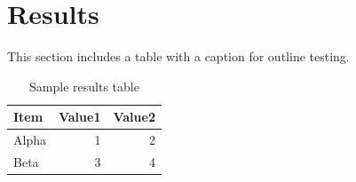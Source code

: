 \section{Results}\label{sec:results}
This section includes a table with a caption for outline testing.

\begin{table}[h]
\centering
\begin{tabular}{lrr}
\hline
Item & Value1 & Value2 \\
\hline
Alpha & 1 & 2 \\
Beta & 3 & 4 \\
\hline
\end{tabular}
\caption{Sample results table}
\label{tab:sample}
\end{table}

